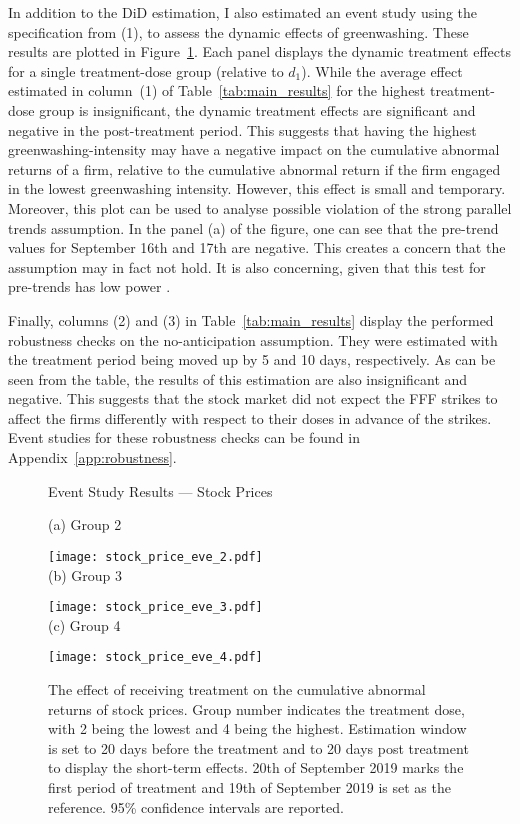 \documentclass[12pt]{article}
\begin{document}
In addition to the DiD estimation, I also estimated an event study using the specification from (1), to assess the dynamic effects of greenwashing. These results are plotted in Figure~\ref{fig:eve_stock}. Each panel displays the dynamic treatment effects for a single treatment-dose group (relative to $d_1$). While the average effect estimated in column~(1) of Table~\ref{tab:main_results} for the highest treatment-dose group is insignificant, the dynamic treatment effects are significant and negative in the post-treatment period. This suggests that having the highest greenwashing-intensity may have a negative impact on the cumulative abnormal returns of a firm, relative to the cumulative abnormal return if the firm engaged in the lowest greenwashing intensity. However, this effect is small and temporary. Moreover, this plot can be used to analyse possible violation of the strong parallel trends assumption. In the panel (a) of the figure, one can see that the pre-trend values for September 16th and 17th are negative. This creates a concern that the assumption may in fact not hold. It is also concerning, given that this test for pre-trends has low power \parencite{rothWhatsTrendingDifferenceindifferences2023}.
                            

Finally, columns (2) and (3) in Table~\ref{tab:main_results} display the performed robustness checks on the no-anticipation assumption. They were estimated with the treatment period being moved up by 5 and 10 days, respectively. As can be seen from the table, the results of this estimation are also insignificant and negative. This suggests that the stock market did not expect the FFF strikes to affect the firms differently with respect to their doses in advance of the strikes. Event studies for these robustness checks can be found in Appendix~\ref{app:robustness}.


\begin{figure}
    \caption{Event Study Results --- Stock Prices}\label{fig:eve_stock}
    \centering
    
    (a) Group 2
    
    \texttt{[image: stock\_price\_eve\_2.pdf]} \\
    
    (b) Group 3
    
    \texttt{[image: stock\_price\_eve\_3.pdf]} \\
    
    (c) Group 4
    
    \texttt{[image: stock\_price\_eve\_4.pdf]}
    
    \captionsetup{font=footnotesize}
    \caption*{The effect of receiving treatment on the cumulative abnormal returns of stock prices. Group number indicates the treatment dose, with 2 being the lowest and 4 being the highest. Estimation window is set to 20 days before the treatment and to 20 days post treatment to display the short-term effects. 20th of September 2019 marks the first period of treatment and 19th of September 2019 is set as the reference. 95\% confidence intervals are reported.}
\end{figure}
\end{document}
